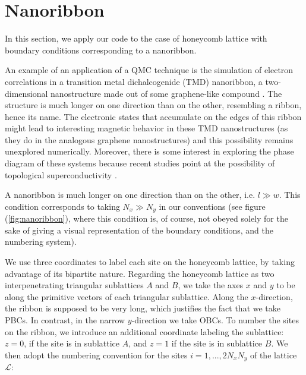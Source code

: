 \section{Nanoribbon}
\label{sec:nanoribbon}

In this section, we apply our code to the case of honeycomb lattice with boundary conditions corresponding to a nanoribbon.

An example of an application of a QMC technique is the simulation of electron correlations in a transition metal dichalcogenide (TMD) nanoribbon, a two-dimensional nanostructure made out of some graphene-like compound \cite{yang_strain-tuning_2017, raczkowski_interplay_2017, chen_fabrication_2017, wang_electronics_2012, braz_valley_2017}. The structure is much longer on one direction than on the other, resembling a ribbon, hence its name. The electronic states that accumulate on the edges of this ribbon might lead to interesting magnetic behavior in these TMD nanostructures (as they do in the analogous graphene nanostructures\cite{yazyev_emergence_2010}) and this possibility remains unexplored numerically\cite{feldner_dynamical_2011, golor_quantum_2013}. Moreover, there is some interest in exploring the phase diagram of these systems because recent studies point at the possibility of topological superconductivity \cite{hsu_topological_2017}.

A nanoribbon is much longer on one direction than on the other, i.e. $l \gg w$. 
This condition corresponds to taking $N_x \gg N_y$ in our conventions (see figure (\ref{fig:nanoribbon}), where this condition is, of course, not obeyed solely for the sake of giving a visual representation of the boundary conditions, and the numbering system).

We use three coordinates to label each site on the honeycomb lattice, by taking advantage of its bipartite nature.
Regarding the honeycomb lattice as two interpenetrating triangular sublattices $A$ and $B$, we take the axes $x$ and $y$ to be along the primitive vectors of each triangular sublattice.
Along the $x$-direction, the ribbon is supposed to be very long, which justifies the fact that we take \acp{PBC}.
In contrast, in the narrow $y$-direction we take \acp{OBC}.
To number the sites on the ribbon, we introduce an additional coordinate labeling the sublattice: $z = 0$, if the site is in sublattice $A$, and $z = 1$ if the site is in sublattice $B$.
We then adopt the numbering convention for the sites $i = 1, ..., 2 N_x N_y$ of the lattice $\mathcal{L}$:

